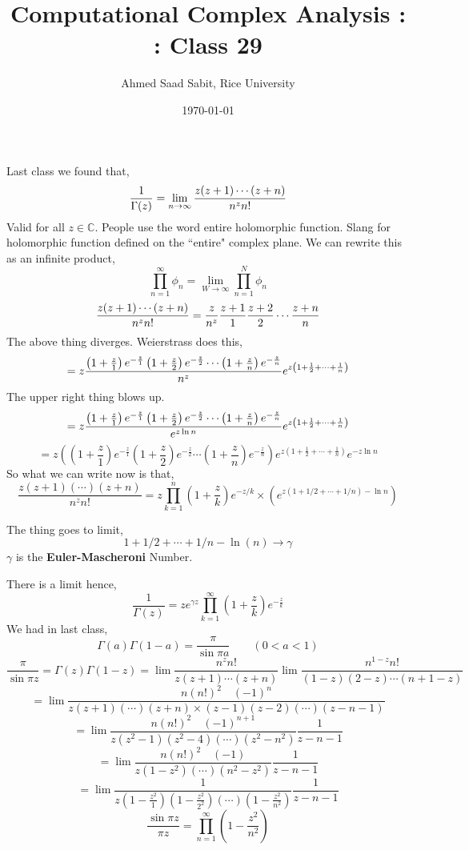 \documentclass[letter]{article}
\title{Computational Complex Analysis : : Class 29}
\author{Ahmed Saad Sabit, Rice University}
\date{\today}
\begin{document}
\maketitle
Last class we found that, 
\[
\frac{1}{\Gamma(z)} = \lim_{n \to \infty} {z(z+1) \cdots (z+n) \over n^{z} n!}
\]
Valid for all $z \in \mathbb{C}$. People use the word entire holomorphic function. Slang for holomorphic function defined on the ``entire" complex plane. We can rewrite this as an infinite product, 
\[
\prod_{n=1}^{\infty}   \phi_n = \lim_{W \to \infty} \prod_{n=1}^{N}  \phi_n 
\]
\[
	{ z ( z+1) \cdots (z+n) \over n^{z} n!} = \frac{z}{n^z} { \frac{z+1}{1} \frac{z+2}{2} \cdots \frac{z+n}{n}}
\] The above thing diverges. Weierstrass does this, 
\[
 = z {
	 \left(1 + \frac{z}{1}\right)e^{- \frac{z}{1}} 
	 \left(1 + \frac{z}{2}\right)e^{- \frac{z}{2}}
	 \cdots 
	 \left(1 + \frac{z}{n}\right)e^{- \frac{z}{n}}
	 \over 
	 n^{z}
 } 
 e^{z \left(1 + \frac{1}{2} + \cdots + \frac{1}{n}\right)}
\]
The upper right thing blows up.  
\[
 = z {
	 \left(1 + \frac{z}{1}\right)e^{- \frac{z}{1}} 
	 \left(1 + \frac{z}{2}\right)e^{- \frac{z}{2}}
	 \cdots 
	 \left(1 + \frac{z}{n}\right)e^{- \frac{z}{n}}
	 \over 
	 e^{ z \ln n}
 } 
 e^{z \left(1 + \frac{1}{2} + \cdots + \frac{1}{n}\right)}
\]
\[
 = z \left({
	 \left(1 + \frac{z}{1}\right)e^{- \frac{z}{1}} 
	 \left(1 + \frac{z}{2}\right)e^{- \frac{z}{2}}
	 \cdots 
	 \left(1 + \frac{z}{n}\right)e^{- \frac{z}{n}}
 }\right) 
 e^{z \left(1 + \frac{1}{2} + \cdots + \frac{1}{n}\right)} 
 e^{-z \ln n}
\]
So what we can write now is that, 
\[
\frac{z(z+1)(\cdots)(z+n)}{n^{z}n!} = 
z \prod_{k= 1}^{n} \left(1 + \frac{z}{k}\right)e^{-z / k } 
\times 
\left(
e^{z (1 + 1 / 2 + \cdots + 1 / n) - \ln n} 
\right)
\]  

The thing goes to limit, 
\[
1 + 1 / 2 + \cdots + 1 / n - \ln(n) \to \gamma
\]
$\gamma$ is the  \textbf{Euler-Mascheroni} Number.

There is a limit hence, 
\[
\boxed{
\frac{1}{\Gamma (z)} = 
z e^{ \gamma z} \prod_{k=1}^{\infty} \left(1 + \frac{z}{k}\right)e^{- \frac{z}{k}} }
\]
We had in last class, 
\[
\Gamma(a) \Gamma(1-a) = \frac{\pi}{\sin \pi a} \qquad \left(0 < a < 1\right)
\]
\[
\frac{\pi}{\sin \pi z}
	= \Gamma(z) \Gamma(1-z) = 
\lim \frac{n^{z} n!}{z(z+1)\cdots (z+n)} 
\lim \frac{n^{1-z} n!}{(1-z)(2-z)\cdots (n+1-z)} 
\]
\[
= \lim 
\frac{n (n!)^2 \quad (-1)^{n}}{z (z+1)(\cdots)(z+n) \times (z-1)(z-2)(\cdots)(z-n-1)}
\]
\[
= \lim
\frac{n(n!)^2 \quad (-1)^{n+1}}{z (z^2 - 1) (z^2 - 4) (\cdots) (z^2-n^2)} \frac{1}{z -n - 1}
\]
\[=
\lim 
\frac{n (n!)^2 \quad (-1)}{z (1-z^2) (\cdots)(n^2-z^2)} \frac{1}{z-n-1}
\]
\[
= \lim 
\frac{1}{z 
\left(1 - \frac{z^2}{1}\right)\left(1 - \frac{z^2}{2^2}\right) \left(\cdots\right) \left(1 - \frac{z^2}{n^2}\right)} \frac{1}{z - n -1 }
\]
\[
\frac{\sin \pi z}{\pi z } = \prod_{n=1}^{\infty} 
\left(1- \frac{z^2}{n^2}\right)
\] 
\end{document}
